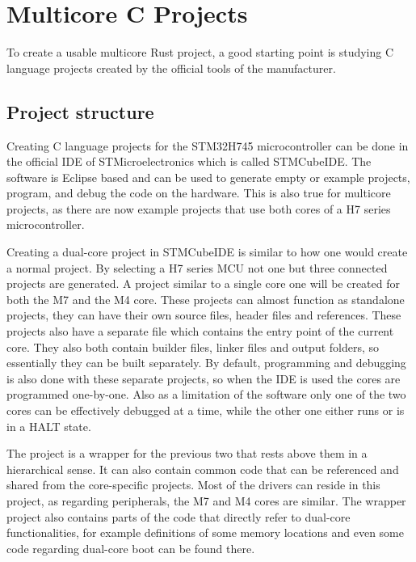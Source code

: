 \chapter{Multicore C Projects}

To create a usable multicore Rust project, a good starting point is studying C language projects created by the official tools of the manufacturer.

\section{Project structure}

Creating C language projects for the STM32H745 microcontroller can be done in the official IDE of STMicroelectronics which is called STMCubeIDE. The software is Eclipse based and can be used to generate empty or example projects, program, and debug the code on the hardware. This is also true for multicore projects, as there are now example projects that use both cores of a H7 series microcontroller. \cite{CExamples}

Creating a dual-core project in STMCubeIDE is similar to how one would create a normal project. By selecting a H7 series MCU not one but three connected projects are generated. A project similar to a single core one will be created for both the M7 and the M4 core. These projects can almost function as standalone projects, they can have their own source files, header files and references. These projects also have a separate  file which contains the entry point of the current core. They also both contain builder files, linker files and output folders, so essentially they can be built separately. By default, programming and debugging is also done with these separate projects, so when the IDE is used the cores are programmed one-by-one. Also as a limitation of the software only one of the two cores can be effectively debugged at a time, while the other one either runs or is in a HALT state.

The project is a wrapper for the previous two that rests above them in a hierarchical sense. It can also contain common code that can be referenced and shared from the core-specific projects. Most of the drivers can reside in this project, as regarding peripherals, the M7 and M4 cores are similar. The wrapper project also contains parts of the code that directly refer to dual-core functionalities, for example definitions of some memory locations and even some code regarding dual-core boot can be found there.

